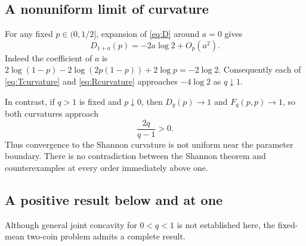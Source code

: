\documentclass[11pt]{article}
\numberwithin{equation}{section}
\theoremstyle{definition}
\theoremstyle{remark}
\begin{document}
\subsection{A nonuniform limit of curvature}
For any fixed $p\in(0,1/2]$, expansion of \eqref{eq:D} around $a=0$ gives
\begin{equation}
 D_{1+a}(p)=-2a\log2+O_p(a^2).\label{eq:Dnearone}
\end{equation}
Indeed the coefficient of $a$ is
$2\log(1-p)-2\log(2p(1-p))+2\log p=-2\log2$.
Consequently each of \eqref{eq:Tcurvature} and \eqref{eq:Rcurvature}
approaches $-4\log2$ as $q\downarrow1$.

In contrast, if $q>1$ is fixed and $p\downarrow0$, then $D_q(p)\to1$ and
$F_q(p,p)\to1$, so both curvatures approach
\begin{equation}
 \frac{2q}{q-1}>0.\label{eq:cornerlimit}
\end{equation}
Thus convergence to the Shannon curvature is not uniform near the
parameter boundary. There is no contradiction between the Shannon theorem
and counterexamples at every order immediately above one.

\subsection{A positive result below and at one}
Although general joint concavity for $0<q<1$ is not established here,
the fixed-mean two-coin problem admits a complete result.
\end{document}
